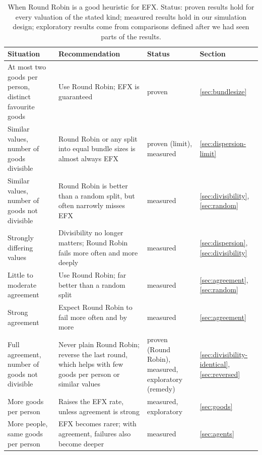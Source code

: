 \begin{table}[ht]
  \centering
  \caption{When Round Robin is a good heuristic for EFX. Status: proven results hold for every
  valuation of the stated kind; measured results hold in our simulation design; exploratory
  results come from comparisons defined after we had seen parts of the results.}
  \label{tab:decision}
  \small
  \begin{tabular}{p{4.3cm}p{5.6cm}p{2.2cm}l}
    \toprule
    Situation & Recommendation & Status & Section \\
    \midrule
    At most two goods per person, distinct favourite goods
      & Use Round Robin; EFX is guaranteed
      & proven & \ref{sec:bundlesize} \\
    Similar values, number of goods divisible
      & Round Robin or any split into equal bundle sizes is almost always EFX
      & proven (limit), measured & \ref{sec:dispersion-limit} \\
    Similar values, number of goods not divisible
      & Round Robin is better than a random split, but often narrowly misses EFX
      & measured & \ref{sec:divisibility}, \ref{sec:random} \\
    Strongly differing values
      & Divisibility no longer matters; Round Robin fails more often and more deeply
      & measured & \ref{sec:dispersion}, \ref{sec:divisibility} \\
    Little to moderate agreement
      & Use Round Robin; far better than a random split
      & measured & \ref{sec:agreement}, \ref{sec:random} \\
    Strong agreement
      & Expect Round Robin to fail more often and by more
      & measured & \ref{sec:agreement} \\
    Full agreement, number of goods not divisible
      & Never plain Round Robin; reverse the last round, which helps with few goods per person or similar values
      & proven (Round Robin), measured, exploratory (remedy) & \ref{sec:divisibility-identical}, \ref{sec:reversed} \\
    More goods per person
      & Raises the EFX rate, unless agreement is strong
      & measured, exploratory & \ref{sec:goods} \\
    More people, same goods per person
      & EFX becomes rarer; with agreement, failures also become deeper
      & measured & \ref{sec:agents} \\
    \bottomrule
  \end{tabular}
\end{table}

